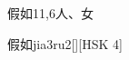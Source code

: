 \begin{entry}{假如}{11,6}{⼈、⼥}
  \begin{phonetics}{假如}{jia3ru2}[][HSK 4]
  \end{phonetics}
\end{entry}

